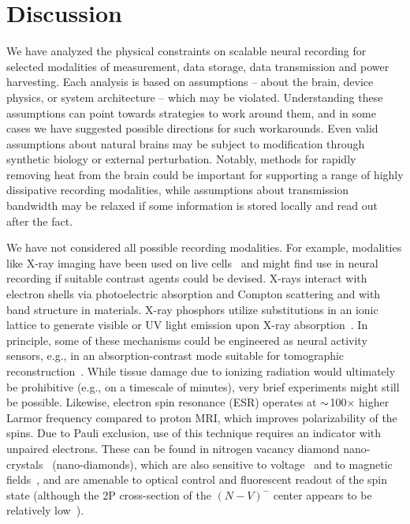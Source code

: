 \section{Discussion}

We have analyzed the physical constraints on scalable neural recording for selected modalities of measurement, data storage, data transmission and power harvesting.
Each analysis is based on assumptions -- about the brain, device physics, or system architecture -- which may be violated.
Understanding these assumptions can point towards strategies to work around them, and in some cases we have suggested possible directions for such workarounds.
Even valid assumptions about natural brains may be subject to modification through synthetic biology or external perturbation.
Notably, methods for rapidly removing heat from the brain could be important for supporting a range of highly dissipative recording modalities, while assumptions about transmission bandwidth may be relaxed if some information is stored locally and read out after the fact.

We have not considered all possible recording modalities.
For example, modalities like X-ray imaging have been used on live cells~\cite{moosmann13} and might find use in neural recording if suitable contrast agents could be devised.
X-rays interact with electron shells via photoelectric absorption and Compton scattering and with band structure in materials.
X-ray phosphors utilize substitutions in an ionic lattice to generate visible or UV light emission upon X-ray absorption~\cite{issler95}.
In principle, some of these mechanisms could be engineered as neural activity sensors, e.g., in an absorption-contrast mode suitable for tomographic reconstruction~\cite{larabell04}. While tissue damage due to ionizing radiation would ultimately be prohibitive (e.g., on a timescale of minutes), very brief experiments might still be possible. Likewise, electron spin resonance (ESR) operates at ${\sim}$100$\times$ higher Larmor frequency compared to proton MRI, which improves polarizability of the spins.
Due to Pauli exclusion, use of this technique requires an indicator with unpaired electrons. These can be found in nitrogen vacancy diamond nano-crystals~\cite{horowitz12} (nano-diamonds), which are also sensitive to voltage~\cite{dolde11} and to magnetic fields~\cite{Hall2012}, and are amenable to optical control and fluorescent readout of the spin state (although the 2P cross-section of the $(N-V)^-$ center appears to be relatively low~\cite{Tse-Luen2007}).

